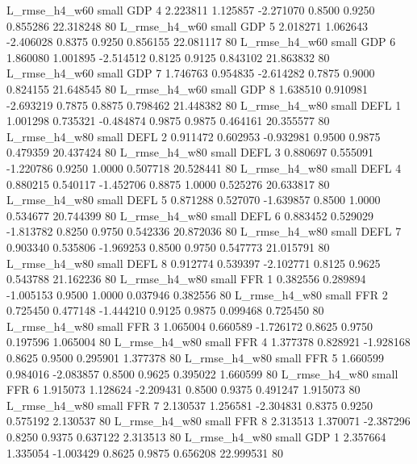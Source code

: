  L_rmse_h4_w60      small      GDP                 4 2.223811 1.125857 -2.271070 0.8500 0.9250  0.855286   22.318248 80
 L_rmse_h4_w60      small      GDP                 5 2.018271 1.062643 -2.406028 0.8375 0.9250  0.856155   22.081117 80
 L_rmse_h4_w60      small      GDP                 6 1.860080 1.001895 -2.514512 0.8125 0.9125  0.843102   21.863832 80
 L_rmse_h4_w60      small      GDP                 7 1.746763 0.954835 -2.614282 0.7875 0.9000  0.824155   21.648545 80
 L_rmse_h4_w60      small      GDP                 8 1.638510 0.910981 -2.693219 0.7875 0.8875  0.798462   21.448382 80
 L_rmse_h4_w80      small     DEFL                 1 1.001298 0.735321 -0.484874 0.9875 0.9875  0.464161   20.355577 80
 L_rmse_h4_w80      small     DEFL                 2 0.911472 0.602953 -0.932981 0.9500 0.9875  0.479359   20.437424 80
 L_rmse_h4_w80      small     DEFL                 3 0.880697 0.555091 -1.220786 0.9250 1.0000  0.507718   20.528441 80
 L_rmse_h4_w80      small     DEFL                 4 0.880215 0.540117 -1.452706 0.8875 1.0000  0.525276   20.633817 80
 L_rmse_h4_w80      small     DEFL                 5 0.871288 0.527070 -1.639857 0.8500 1.0000  0.534677   20.744399 80
 L_rmse_h4_w80      small     DEFL                 6 0.883452 0.529029 -1.813782 0.8250 0.9750  0.542336   20.872036 80
 L_rmse_h4_w80      small     DEFL                 7 0.903340 0.535806 -1.969253 0.8500 0.9750  0.547773   21.015791 80
 L_rmse_h4_w80      small     DEFL                 8 0.912774 0.539397 -2.102771 0.8125 0.9625  0.543788   21.162236 80
 L_rmse_h4_w80      small      FFR                 1 0.382556 0.289894 -1.005153 0.9500 1.0000  0.037946    0.382556 80
 L_rmse_h4_w80      small      FFR                 2 0.725450 0.477148 -1.444210 0.9125 0.9875  0.099468    0.725450 80
 L_rmse_h4_w80      small      FFR                 3 1.065004 0.660589 -1.726172 0.8625 0.9750  0.197596    1.065004 80
 L_rmse_h4_w80      small      FFR                 4 1.377378 0.828921 -1.928168 0.8625 0.9500  0.295901    1.377378 80
 L_rmse_h4_w80      small      FFR                 5 1.660599 0.984016 -2.083857 0.8500 0.9625  0.395022    1.660599 80
 L_rmse_h4_w80      small      FFR                 6 1.915073 1.128624 -2.209431 0.8500 0.9375  0.491247    1.915073 80
 L_rmse_h4_w80      small      FFR                 7 2.130537 1.256581 -2.304831 0.8375 0.9250  0.575192    2.130537 80
 L_rmse_h4_w80      small      FFR                 8 2.313513 1.370071 -2.387296 0.8250 0.9375  0.637122    2.313513 80
 L_rmse_h4_w80      small      GDP                 1 2.357664 1.335054 -1.003429 0.8625 0.9875  0.656208   22.999531 80
